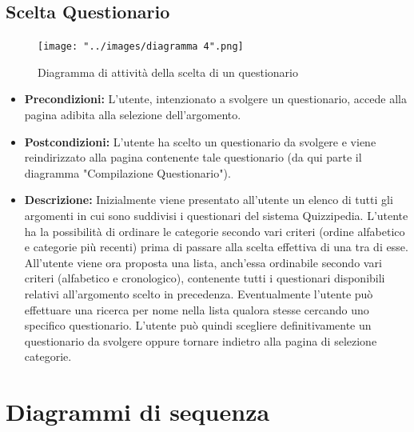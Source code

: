 \documentclass[a4paper,11pt]{article}
\begin{document}
\subsection{Scelta Questionario}
\begin{figure}[h!]
\begin{center}
	\texttt{[image: "../images/diagramma 4".png]}
	\caption{Diagramma di attività della scelta di un questionario}
\end{center}
\end{figure}
\begin{itemize}
\item\textbf{Precondizioni:} L'utente, intenzionato a svolgere un questionario, accede alla pagina adibita alla selezione dell'argomento.
\item\textbf{Postcondizioni:} L'utente ha scelto un questionario da svolgere e viene reindirizzato alla pagina contenente tale questionario (da qui parte il diagramma "Compilazione Questionario").
\item\textbf{Descrizione:} Inizialmente viene presentato all'utente un elenco di tutti gli argomenti in cui sono suddivisi i questionari del sistema Quizzipedia. L'utente ha la possibilità di ordinare le categorie secondo vari criteri (ordine alfabetico e categorie più recenti) prima di passare alla scelta effettiva di una tra di esse. All'utente viene ora proposta una lista, anch'essa ordinabile secondo vari criteri (alfabetico e cronologico), contenente tutti i questionari disponibili relativi all'argomento scelto in precedenza. Eventualmente l'utente può effettuare una ricerca per nome nella lista qualora stesse cercando uno specifico questionario. L'utente può quindi scegliere definitivamente un questionario da svolgere oppure tornare indietro alla pagina di selezione categorie.
\end{itemize}
\newpage

	\section{Diagrammi di sequenza}
\end{document}
